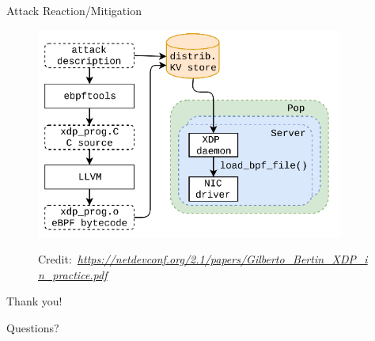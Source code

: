 \documentclass{beamer}
\newcommand{\credit}[1]{\par\hfill \tiny Credit:~\itshape#1}
\begin{document}
\begin{frame}{Attack Reaction/Mitigation}
  \begin{figure}
    \includegraphics[width=0.9\textwidth]{./xdp_reaction.png}
    \credit{\url{https://netdevconf.org/2.1/papers/Gilberto_Bertin_XDP_in_practice.pdf}}
  \end{figure}
\end{frame}

\begin{frame}
  \begin{center}
    \Huge Thank you!
  \end{center}
\end{frame}

\begin{frame}
  \begin{center}
    \Huge Questions?
  \end{center}
\end{frame}
\end{document}
